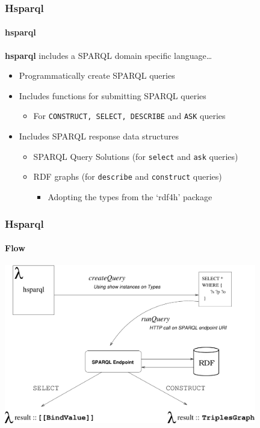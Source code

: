 \documentclass{beamer}
\begin{document}
\begin{frame}[fragile]
\frametitle{Hsparql}
\framesubtitle{hsparql}

\textbf{hsparql} includes a SPARQL domain specific language\ldots

\begin{itemize}
\item Programmatically create SPARQL queries
  
\item Includes functions for submitting SPARQL queries
  
  \begin{itemize}
  \item For \texttt{CONSTRUCT, SELECT, DESCRIBE} and \texttt{ASK} queries
  \end{itemize}
  
\item Includes SPARQL response data structures
  
  \begin{itemize}
  \item SPARQL Query Solutions (for \texttt{select} and \texttt{ask} queries)
  \item RDF graphs (for \texttt{describe} and \texttt{construct}
    queries)

    \begin{itemize}
    \item Adopting the types from the `rdf4h' package
    \end{itemize}

  \end{itemize}

\end{itemize}

\end{frame}

\begin{frame}
\frametitle{Hsparql}
\framesubtitle{Flow}

\begin{center}
\includegraphics[width=110mm]{images/hsparql-flow.pdf}
\end{center}


\end{frame}
\end{document}

